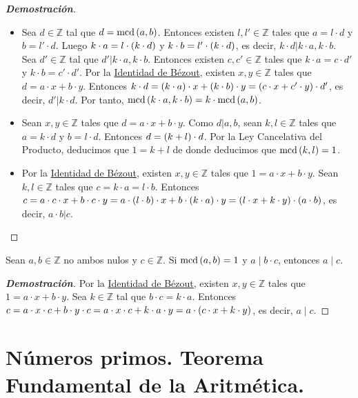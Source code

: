\begin{proposition}
\begin{proof}[\rm\textbf{Demostración}]
\begin{itemize}
\begin{itemize}
        Necesariamente, $1=\text{mcd}\pr{a,b}$, es decir, $a$ y $b$ son coprimos.
      \end{itemize}
      \item[2.] Sea $d\in\mathbb{Z}$ tal que $d=\text{mcd}\left(a,b\right)$. Entonces existen $l,l'\in\mathbb{Z}$ tales que $a=l\cdot d$ y $b=l'\cdot d$. Luego $k\cdot a=l\cdot\left(k\cdot d\right)$ y $k\cdot b=l'\cdot\left(k\cdot d\right)$, es decir, $k\cdot d|k\cdot a,k\cdot b$. Sea $d'\in\mathbb{Z}$ tal que $d'|k\cdot a,k\cdot b$. Entonces existen $c,c'\in\mathbb{Z}$ tales que $k\cdot a=c\cdot d'$ y $k\cdot b=c'\cdot d'$. Por la \hyperref[Identidad de Bézout]{Identidad de Bézout}, existen $x,y\in\mathbb{Z}$ tales que $d=a\cdot x+b\cdot y$. Entonces $k\cdot d=\left(k\cdot a\right)\cdot x+\left(k\cdot b\right)\cdot y=\left(c\cdot x+c'\cdot y\right)\cdot d'$, es decir, $d'|k\cdot d$. Por tanto, $\text{mcd}\left(k\cdot a,k\cdot b\right)=k\cdot\text{mcd}\left(a,b\right)$.
      \item[3.] Sean $x,y\in\mathbb{Z}$ tales que $d=a\cdot x+b\cdot y$. Como $d|a,b$, sean $k,l\in\mathbb{Z}$ tales que $a=k\cdot d$ y $b=l\cdot d$. Entonces $d=\left(k+l\right)\cdot d$. Por la Ley Cancelativa del Producto, deducimos que $1=k+l$ de donde deducimos que $\text{mcd}\left(k,l\right)=1$.
      \item[4.] Por la \hyperref[Identidad de Bézout]{Identidad de Bézout}, existen $x,y\in\mathbb{Z}$ tales que $1=a\cdot x+b\cdot y$. Sean $k,l\in\mathbb{Z}$ tales que $c=k\cdot a=l\cdot b$. Entonces $c=a\cdot c\cdot x+b\cdot c\cdot y=a\cdot\left(l\cdot b\right)\cdot x+b\cdot\left(k\cdot a\right)\cdot y=\left(l\cdot x+k\cdot y\right)\cdot\left(a\cdot b\right)$, es decir, $a\cdot b|c$.
    \end{itemize}
  \end{proof}
\end{proposition}


\begin{lemma}\label{Lema de Euclides}
  \rm Sean $a,b\in\mathbb{Z}$ no ambos nulos y $c\in\mathbb{Z}$. Si $\text{mcd}\left(a,b\right)=1$ y $a\mid b\cdot c$, entonces $a\mid c$.
  \begin{proof}[\rm\textbf{Demostración}]
    Por la \hyperref[Identidad de Bézout]{Identidad de Bézout}, existen $x,y\in\mathbb{Z}$ tales que $1=a\cdot x+b\cdot y$. Sea $k\in\mathbb{Z}$ tal que $b\cdot c=k\cdot a$. Entonces $c=a\cdot x\cdot c+b\cdot y\cdot c=a\cdot x\cdot c+k\cdot a\cdot y=a\cdot\left(c\cdot x+k\cdot y\right)$, es decir, $a\mid c$.
  \end{proof}
\end{lemma}
\section{Números primos. Teorema Fundamental de la Aritmética.}

